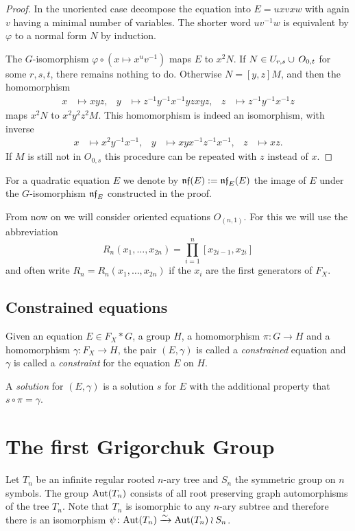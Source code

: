 \documentclass[a4paper,11pt]{amsart}
\begin{document}
\begin{proof}
  In the unoriented case decompose the equation into $E = uxvxw$ with
  again $v$ having a minimal number of variables.  The shorter word
  $uv^{-1}w$ is equivalent by $\varphi$ to a normal form $N$ by
  induction.
 
  The $G$-isomorphism $\varphi \circ (x\mapsto x^uv^{-1})$ maps $E$ to
  $x^2N$. If $N\in U_{r,s}\cup\thinspace O_{0,t}$ for some $r,s,t$,
  there remains nothing to do.  Otherwise $N=[y,z]M$, and then the
  homomorphism
  \begin{align*}
    x&\mapsto xyz, & y&\mapsto z^{-1}y^{-1}x^{-1}yzxyz, & z&\mapsto z^{-1}y^{-1}x^{-1}z
  \end{align*}
  maps $x^2N$ to $x^2y^2z^2M$. This homomorphism is indeed an
  isomorphism, with inverse
  \begin{align*}
    x&\mapsto x^2y^{-1}x^{-1}, & y&\mapsto xyx^{-1}z^{-1}x^{-1}, & z&\mapsto xz.
  \end{align*}
  If $M$ is still not in $O_{0,s}$ this procedure can be repeated with
  $z$ instead of $x$.
\end{proof}
For a quadratic equation $E$ we denote by $\mathfrak{nf}(E) := \mathfrak{nf}_E(E)$
the image of $E$ under the $G$-isomorphism $\mathfrak{nf}_E$ constructed in
the proof.

From now on we will consider oriented equations $O_{(n,1)}$. For this
we will use the abbreviation
\[R_n(x_1,\ldots,x_{2n})=\prod_{i=1}^n [x_{2i-1},x_{2i}]\]
and often write $R_n=R_n(x_1,\ldots,x_{2n})$ if the $x_i$ are the
first generators of $F_X$.

\subsection{Constrained equations}
\begin{defi}
  Given an equation $E \in F_X*G$, a group $H$, a homomorphism
  $\pi\colon G \to H$ and a homomorphism $\gamma\colon F_X \to H$, the
  pair $(E,\gamma)$ is called a \emph{constrained} equation and
  $\gamma$ is called a \emph{constraint} for the equation $E$ on $H$.
 
  A \emph{solution} for $(E,\gamma)$ is a solution $s$ for $E$ with the
  additional property that $s\circ\pi=\gamma$.
\end{defi}

\section{The first Grigorchuk Group}\label{sec:GrigorchukGroup}
Let $T_n$ be an infinite regular rooted $n$-ary tree and $S_n$ the symmetric group on $n$ symbols.
The group $\textup{Aut}(T_n)$ consists of all root preserving graph automorphisms of the tree $T_n$. 
Note that $T_n$ is isomorphic to any $n$-ary subtree and therefore there is an isomorphism
$\psi\colon \textup{Aut}(T_n)\xrightarrow{\sim} \textup{Aut}(T_n)\wr S_n$. 
\end{document}
